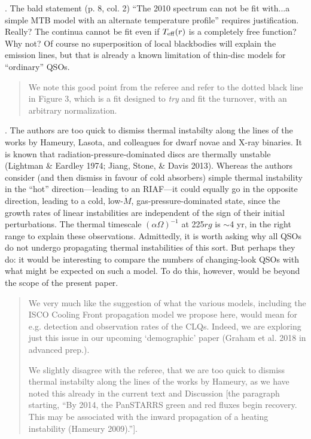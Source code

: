 \documentclass[11pt, a4paper]{article}
\begin{document}
. The bald statement (p. 8, col. 2) ``The 2010 spectrum can not be fit
with...a simple MTB model with an alternate temperature profile''
requires justification. Really? The continua cannot be fit even if
$T_{\rm eff}(r)$ is a completely free function? Why not? Of course no
superposition of local blackbodies will explain the emission lines,
but that is already a known limitation of thin-disc models for
``ordinary'' QSOs.

\begin{quote}
We note this good point from the referee and refer to the dotted black line
in Figure 3, which is a fit designed to {\it try} and fit the
turnover, with an arbitrary normalization. 

\end{quote}


. The authors are too quick to dismiss thermal instabilty along the
lines of the works by Hameury, Lasota, and colleagues for dwarf novae
and X-ray binaries. It is known that radiation-pressure-dominated
discs are thermally unstable (Lightman \& Eardley 1974; Jiang, Stone,
\& Davis 2013). Whereas the authors consider (and then dismiss in
favour of cold absorbers) simple thermal instability in the “hot”
direction—leading to an RIAF—it could equally go in the opposite
direction, leading to a cold, low-$\dot{M}$, gas-pressure-dominated state,
since the growth rates of linear instabilities are independent of the
sign of their initial perturbations. The thermal timescale
$(\alpha\Omega)^{−1}$ at 225$rg$ is $\sim$4 yr, in the right range to
explain these observations. Admittedly, it is worth asking why all
QSOs do not undergo propagating thermal instabilities of this
sort. But perhaps they do: it would be interesting to compare the
numbers of changing-look QSOs with what might be expected on such a
model. To do this, however, would be beyond the scope of the present
paper.

\begin{quote}
We very much like the suggestion of what the various models, including the
ISCO Cooling Front propagation model we propose here, would mean for 
e.g. detection and observation rates of the CLQs. Indeed, we are exploring 
just this issue in our upcoming `demographic' paper (Graham et al. 2018 in 
advanced prep.). 

We slightly disagree with the referee, that we are too quick to dismiss thermal 
instabilty along the lines of the works by Hameury, as we have noted this already 
in the current text and Discussion [the paragraph starting, ``By 2014, the PanSTARRS green and red fluxes begin recovery. This may
be associated with the inward propagation of a heating instability (Hameury 2009).'']. 
\end{quote}
\end{document}
